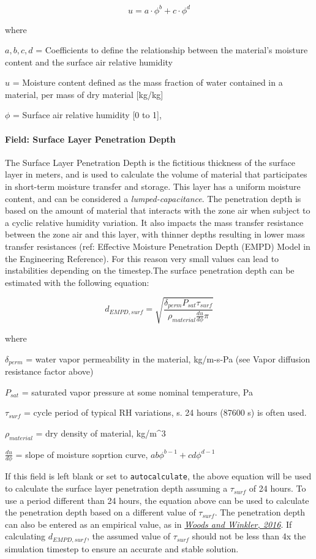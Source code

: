 \[ u = a \cdot \phi^b + c \cdot \phi^d \]

where

\(a,b,c,d\) = Coefficients to define the relationship between the
material's moisture content and the surface air relative humidity

\(u\) = Moisture content defined as the mass fraction of water contained
in a material, per mass of dry material {[}kg/kg{]}

\(\phi\) = Surface air relative humidity {[}0 to 1{]},

\paragraph{Field: Surface Layer Penetration
	Depth}\label{field-surface-layer-penetration-depth}

The Surface Layer Penetration Depth is the fictitious thickness of the
surface layer in meters, and is used to calculate the volume of material
that participates in short-term moisture transfer and storage. This
layer has a uniform moisture content, and can be considered a
\emph{lumped-capacitance}. The penetration depth is based on the amount
of material that interacts with the zone air when subject to a cyclic
relative humidity variation. It also impacts the mass transfer resistance
between the zone air and this layer, with thinner depths resulting in lower
mass transfer resistances (ref: Effective Moisture Penetration Depth (EMPD) Model
in the Engineering Reference). For this reason very small values can lead to
instabilities depending on the timestep.The surface penetration depth can be
estimated with the following equation:

\[ d_{EMPD,surf} = \sqrt{\frac{\delta_{perm} P_{sat} \tau_{surf}}{\rho_{material} \frac{du}{d\phi} \pi}} \]

where

\(\delta_{perm}\) = water vapor permeability in the material, kg/m-s-Pa
(see Vapor diffusion resistance factor above)

\(P_{sat}\) = saturated vapor pressure at some nominal temperature, Pa

\(\tau_{surf}\) = cycle period of typical RH variations, s. 24 hours
(87600 s) is often used.

\(\rho_{material}\) = dry density of material, kg/m\^{}3

\(\frac{du}{d\phi}\) = slope of moisture soprtion curve,
\(a b \phi^{b-1} + c d \phi^{d-1}\)

If this field is left blank or set to \texttt{autocalculate},
the above equation will be used to calculate the surface layer penetration depth
assuming a $\tau_{surf}$ of 24 hours.
To use a period different than 24 hours, the equation above can be used to calculate the penetration depth based on a different value of $\tau_{surf}$. The penetration depth can also be entered as an empirical value, as in \href{http://dx.doi.org/10.1016/j.enbuild.2016.02.008}{\emph{Woods and Winkler, 2016}}. If calculating $d_{EMPD,surf}$, the assumed value of $\tau_{surf}$ should not be less than 4x the simulation timestep to ensure an accurate and stable solution.

